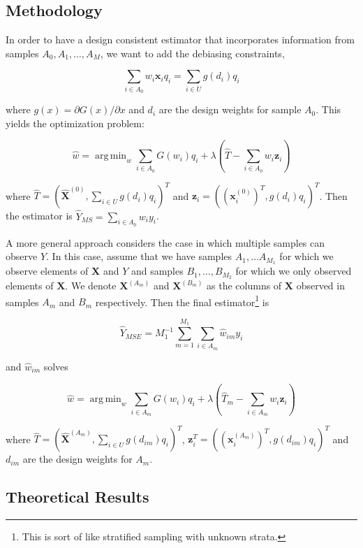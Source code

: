 \documentclass[12pt]{article}
\DeclareMathOperator*{\argmin}{arg\,min}
\renewcommand{\bf}[1]{\mathbf{#1}}
\begin{document}
\subsection{Methodology}

In order to have a design consistent estimator that incorporates information from
samples $A_0, A_1, \dots, A_M$, we want to add the debiasing constraints, 

$$ \sum_{i \in A_0} w_{i} \bf x_i q_i = \sum_{i \in U} g(d_i) q_i $$ 

where $g(x) = \partial G(x) / \partial x$ and $d_i$ are the design weights for
sample $A_0$. This yields the optimization problem:

\begin{equation}\label{eq:dc3}
  \hat w = \argmin_w \sum_{i \in A_0} G(w_i) q_i + \lambda\left(\hat T - \sum_{i
  \in A_0} w_i \bf z_i\right)
\end{equation}

where $\hat T = (\hat{\bf X}^{(0)}, \sum_{i \in U} g(d_i) q_i)^T$ and 
$\bf z_i = ((\bf x_i^{(0)})^T, g(d_i)q_i)^T$. Then the estimator is $\hat Y_{MS}
= \sum_{i \in A_0} w_{i} y_i$.

A more general approach considers
the case in which multiple samples can observe $Y$. In this case, assume that we
have samples $A_1, \dots A_{M_1}$ for which we observe elements of $\bf X$ and
$Y$ and samples $B_1, \dots, B_{M_2}$ for which we only observed elements of
$\bf X$. We denote $\bf X^{(A_m)}$ and $\bf X^{(B_m)}$ as the columns of $\bf X$
observed in samples $A_m$ and $B_m$ respectively. Then the final
estimator\footnote{This is sort of like stratified sampling with unknown
strata.} is 

$$ \hat Y_{MSE} = M_1^{-1} \sum_{m = 1}^{M_1} \sum_{i \in A_m} \hat w_{im} y_i $$

and $\hat w_{im}$ solves  

\begin{equation}\label{eq:dc32}
  \hat w = \argmin_w \sum_{i \in A_m} G(w_i) q_i + \lambda\left(\hat T_m - \sum_{i
  \in A_m} w_i \bf z_i\right)
\end{equation}

where $\hat T = (\hat{\bf X}^{(A_m)}, \sum_{i \in U} g(d_{im}) q_i)^T$, $\bf
z_i^{T} = ((\bf x_i^{(A_m)})^T, g(d_{im})q_i)^T$ and $d_{im}$
are the design weights for $A_m$.

\subsection{Theoretical Results}
\end{document}
